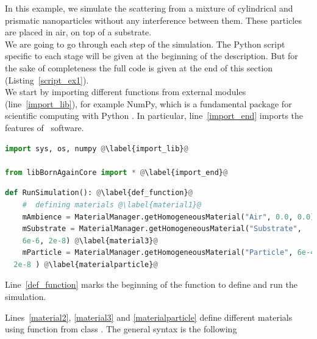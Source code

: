  

In this example, we simulate the scattering from a mixture of
cylindrical and prismatic nanoparticles without any interference
between them. These particles are placed in air, on top
of a substrate.\\ We are going to go through each step of the
simulation. The Python script specific to each stage will be given at
the beginning of the description. But for the sake of completeness the full code is given
at the end of this section (Listing~\ref{script_ex1}). \\

\noindent We start by importing different functions from external
modules (line~\ref{import_lib}), for example NumPy, which
is a fundamental package for scientific computing with Python \cite{s:numpy}.  In particular, line~\ref{import_end}
imports the features of \BornAgain\ software.\\

\begin{lstlisting}[language=python, style=eclipseboxed,name=ex1,nolol]
import sys, os, numpy @\label{import_lib}@

from libBornAgainCore import * @\label{import_end}@
\end{lstlisting}


 

\begin{lstlisting}[language=python, style=eclipseboxed,name=ex1,nolol]
def RunSimulation(): @\label{def_function}@
    #  defining materials @\label{material1}@
    mAmbience = MaterialManager.getHomogeneousMaterial("Air", 0.0, 0.0)  @\label{material2}@
    mSubstrate = MaterialManager.getHomogeneousMaterial("Substrate",
    6e-6, 2e-8) @\label{material3}@
    mParticle = MaterialManager.getHomogeneousMaterial("Particle", 6e-4,
  2e-8 ) @\label{materialparticle}@
\end{lstlisting}

\noindent Line~\ref{def_function} marks the beginning of the
function to define and run the simulation. 

\noindent Lines~\ref{material2}, \ref{material3} and \ref{materialparticle} define different
materials using function  from class
. The general syntax is the following 

